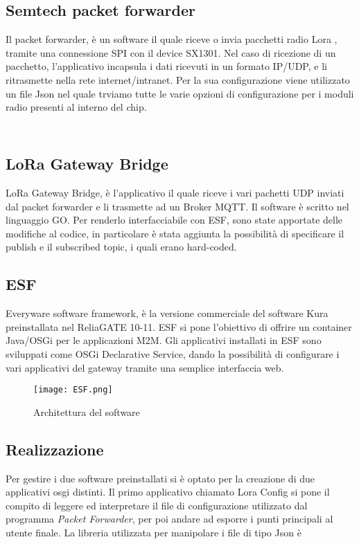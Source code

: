 \subsection{Semtech packet forwarder}
Il packet forwarder, è un software il quale riceve o invia pacchetti radio Lora ,
tramite una connessione SPI con il device SX1301. Nel caso di ricezione di un
pacchetto, l'applicativo incapsula i dati ricevuti in un formato IP/UDP, e li
ritrasmette nella rete internet/intranet. Per la sua configurazione viene
utilizzato un file Json nel quale trviamo tutte le varie opzioni di
configurazione per i moduli radio presenti al interno del chip.
\inputminted[mathescape, gobble=2, frame=lines, linenos=true
framesep=2mm, firstline=1,lastline=23]{json}{Code_Files/global_json.conf}
\inputminted[mathescape, gobble=2, frame=lines, linenos=true
framesep=2mm, firstline=173,lastline=184]{json}{Code_Files/global_json.conf}

\subsection{LoRa Gateway Bridge}
LoRa Gateway Bridge, è l'applicativo il quale riceve i vari pachetti UDP inviati
dal packet forwarder e li trasmette ad un Broker MQTT. Il software è scritto nel
linguaggio GO. Per renderlo interfacciabile con ESF, sono state apportate delle 
modifiche al codice, in particolare è stata aggiunta la possibilità di
specificare il publish e il subscribed topic, i quali erano hard-coded.

\subsection{ESF}
Everyware software framework, è la versione commerciale del software Kura
preinstallata nel ReliaGATE 10-11. ESF si pone l'obiettivo di offrire un
container Java/OSGi per le applicazioni M2M. Gli applicativi installati in ESF
sono sviluppati come OSGi Declarative Service, dando la possibilità di
configurare i vari applicativi del gateway tramite una semplice interfaccia web.

\begin{figure}[h]
\centering 
\texttt{[image: ESF.png]}
\caption{Architettura del software}
\label{fig:Software_stack}
\end{figure}

\subsection{Realizzazione}
Per gestire i due software preinstallati si è optato per la creazione di due
applicativi osgi distinti.
Il primo applicativo chiamato Lora Config si pone il compito di leggere ed
interpretare il file di configurazione utilizzato dal programma \emph{Packet
Forwarder}, per poi andare ad esporre i punti principali al utente finale.
La libreria utilizzata per manipolare i file di tipo Json è 

